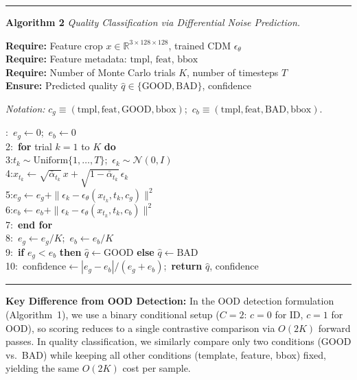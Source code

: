 \medskip
\noindent\rule{\textwidth}{0.4pt}
\smallskip
\begin{minipage}{\linewidth}\small\sloppy
\noindent\textbf{Algorithm 2} \emph{Quality Classification via Differential Noise Prediction.}\label{alg:quality_classification}

\noindent\textbf{Require:} Feature crop $x \in \mathbb{R}^{3 \times 128 \times 128}$, trained CDM $\epsilon_\theta$\\
\textbf{Require:} Feature metadata: $\text{tmpl}$, $\text{feat}$, $\text{bbox}$\\
\textbf{Require:} Number of Monte Carlo trials $K$, number of timesteps $T$\\
\textbf{Ensure:} Predicted quality $\hat{q} \in \{\text{GOOD}, \text{BAD}\}$, confidence

\noindent\textit{Notation:} $c_g \equiv (\text{tmpl}, \text{feat}, \text{GOOD}, \text{bbox})$;\
$c_b \equiv (\text{tmpl}, \text{feat}, \text{BAD}, \text{bbox})$.

:\ $e_g \leftarrow 0$;\ $e_b \leftarrow 0$\\
2:\ \textbf{for} trial $k = 1$ to $K$ \textbf{do}\\
3:\quad $t_k \sim \text{Uniform}\{1, \ldots, T\}$;\ $\epsilon_k \sim \mathcal{N}(0, I)$\\
4:\quad $x_{t_k} \leftarrow \sqrt{\bar{\alpha}_{t_k}}\, x + \sqrt{1 - \bar{\alpha}_{t_k}}\, \epsilon_k$\\
5:\quad $e_g \leftarrow e_g + \|\epsilon_k - \epsilon_\theta(x_{t_k}, t_k, c_g)\|^2$\\
6:\quad $e_b \leftarrow e_b + \|\epsilon_k - \epsilon_\theta(x_{t_k}, t_k, c_b)\|^2$\\
7:\ \textbf{end for}\\
8:\ $e_g \leftarrow e_g / K$;\ $e_b \leftarrow e_b / K$\\
9:\ \textbf{if} $e_g < e_b$ \textbf{then} $\hat{q} \leftarrow \text{GOOD}$ \textbf{else} $\hat{q} \leftarrow \text{BAD}$\\
10:\ $\text{confidence} \leftarrow |e_g - e_b| / (e_g + e_b)$;\ \textbf{return} $\hat{q}$, confidence
\end{minipage}
\smallskip
\noindent\rule{\textwidth}{0.4pt}
\medskip

\textbf{Key Difference from OOD Detection:} In the OOD detection formulation (Algorithm~1), we use a binary conditional setup ($C = 2$: $c = 0$ for ID, $c = 1$ for OOD), so scoring reduces to a single contrastive comparison via $O(2K)$ forward passes. In quality classification, we similarly compare only two conditions (GOOD vs.\ BAD) while keeping all other conditions (template, feature, bbox) fixed, yielding the same $O(2K)$ cost per sample.

